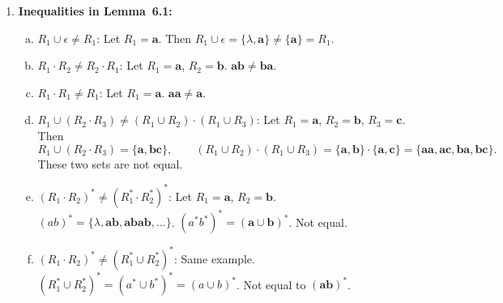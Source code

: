 \begin{enumerate}[{6.}1.]
\medskip
\noindent\textbf{Step 2: Concatenate with $\{\pmb{c}\}$ using the pattern of Example~6.6.}
Let
\[
A_{\pmb{c}}=\langle\Sigma,\{r_0,r_1\},\{r_0\},\delta_{\pmb{c}},\{r_1\}\rangle
\]
with $\delta_{\pmb{c}}(r_0,\pmb{c})=\{r_1\}$ and all other transitions empty.
Using the exact concatenation construction, form
\[
A_{\pmb{a}^*\pmb{c}}
=\langle\Sigma,\{t_0,t_1,q_0,r_0,r_1\},\{t_0,q_0\},\delta_\bullet,\{r_1\}\rangle,
\]
where $\delta_\bullet$ agrees with the old transitions and, because $t_1$ and
$q_0$ are final in $A_{\pmb{a}^*}$, they also mimic the transitions out of
$r_0$.  Thus
\[
\delta_\bullet(t_0,\pmb{a})=\{t_1\},\qquad
\delta_\bullet(t_1,\pmb{a})=\{t_1\},\qquad
\delta_\bullet(t_1,\pmb{c})=\{r_1\},
\]
\[
\delta_\bullet(q_0,\pmb{c})=\{r_1\},\qquad
\delta_\bullet(r_0,\pmb{c})=\{r_1\},
\]
and every other transition is empty.  As in Example~6.6, the state $r_0$
remains disconnected.

\medskip
\noindent\textbf{Step 3: Union with $\{\pmb{b}\}$ using Theorem~5.2.}
Let
\[
A_{\pmb{b}}=\langle\Sigma,\{s_0,s_1\},\{s_0\},\delta_{\pmb{b}},\{s_1\}\rangle
\]
with $\delta_{\pmb{b}}(s_0,\pmb{b})=\{s_1\}$ and all other transitions empty.
Then Theorem~5.2 yields
\[
A=
\langle
\Sigma,
\{t_0,t_1,q_0,r_0,r_1,s_0,s_1\},
\{t_0,q_0,s_0\},
\delta,
\{r_1,s_1\}
\rangle,
\]
where $\delta$ agrees with $\delta_\bullet$ on
$\{t_0,t_1,q_0,r_0,r_1\}$, agrees with $\delta_{\pmb{b}}$ on
$\{s_0,s_1\}$, and has no other transitions.  This is the required unsimplified
NDFA for $\pmb{b}\cup\pmb{a}^*\pmb{c}$.

\item \textbf{Inequalities in Lemma~6.1:}

\begin{enumerate}[(a)]
  \item $R_1\cup\epsilon\neq R_1$: Let $R_1=\pmb{a}$.  Then $R_1\cup\epsilon=\{\lambda,\pmb{a}\}\neq\{\pmb{a}\}=R_1$.
  \item $R_1\cdot R_2\neq R_2\cdot R_1$: Let $R_1=\pmb{a}$, $R_2=\pmb{b}$.  $\pmb{ab}\neq\pmb{ba}$.
  \item $R_1\cdot R_1\neq R_1$: Let $R_1=\pmb{a}$.  $\pmb{aa}\neq\pmb{a}$.
  \item $R_1\cup(R_2\cdot R_3)\neq(R_1\cup R_2)\cdot(R_1\cup R_3)$: Let $R_1=\pmb{a}$, $R_2=\pmb{b}$, $R_3=\pmb{c}$.  Then
  \[
    R_1\cup(R_2\cdot R_3)=\{\pmb{a},\pmb{bc}\},
    \qquad
    (R_1\cup R_2)\cdot(R_1\cup R_3)=\{\pmb{a},\pmb{b}\}\cdot\{\pmb{a},\pmb{c}\}
    =\{\pmb{aa},\pmb{ac},\pmb{ba},\pmb{bc}\}.
  \]
  These two sets are not equal.
  \item $(R_1\cdot R_2)^*\neq(R_1^*\cdot R_2^*)^*$: Let $R_1=\pmb{a}$, $R_2=\pmb{b}$.  $(ab)^*=\{\lambda,\pmb{ab},\pmb{abab},\ldots\}$.  $(a^*b^*)^*=(\pmb{a}\cup\pmb{b})^*$.  Not equal.
  \item $(R_1\cdot R_2)^*\neq(R_1^*\cup R_2^*)^*$: Same example.  $(R_1^*\cup R_2^*)^*=(a^*\cup b^*)^*=(a\cup b)^*$.  Not equal to $(\pmb{ab})^*$.
\end{enumerate}


\end{enumerate}
